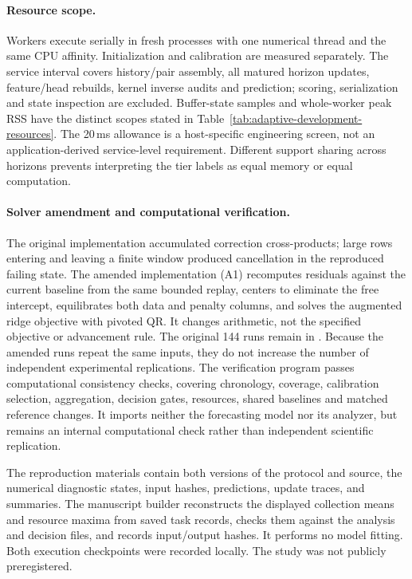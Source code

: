 

\paragraph{Resource scope.}
Workers execute serially in fresh processes with one numerical thread and
the same CPU affinity. Initialization and calibration are measured
separately. The service interval covers history/pair assembly, all matured
horizon updates, feature/head rebuilds, kernel inverse audits and prediction;
scoring, serialization and state inspection are excluded. Buffer-state
samples and whole-worker peak RSS have the distinct scopes stated in
Table~\ref{tab:adaptive-development-resources}. The 20\,ms allowance is a
host-specific engineering screen, not an application-derived service-level
requirement. Different support sharing across horizons prevents interpreting
the tier labels as equal memory or equal computation.

\paragraph{Solver amendment and computational verification.}
The original implementation accumulated correction cross-products;
large rows entering and leaving a finite window produced cancellation in
the reproduced failing state. The amended implementation (A1) recomputes residuals against the
current baseline from the same bounded replay, centers to eliminate the
free intercept, equilibrates both data and penalty columns, and solves
the augmented ridge objective with pivoted QR. It changes arithmetic, not
the specified objective or advancement rule. The original 144 runs remain
in .
Because the amended runs repeat the same inputs, they do not increase
the number of independent experimental replications. The verification program passes
\ADAuditChecks{} computational consistency checks, covering chronology,
coverage, calibration selection, aggregation, decision gates, resources,
shared baselines and matched reference changes. It imports neither the
forecasting model nor its analyzer, but remains an internal computational
check rather than independent scientific replication.

The reproduction materials contain both versions of the protocol and
source, the numerical diagnostic states, input hashes, predictions,
update traces, and summaries. The manuscript builder
 reconstructs
the displayed collection means and resource maxima from saved task
records, checks them against the analysis and decision files, and records
input/output hashes. It performs no model fitting. Both execution checkpoints were recorded locally. The study was not
publicly preregistered.
